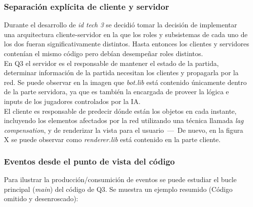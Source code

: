 \documentclass[a4paper,12pt]{report}
\begin{document}
	\subsubsection{Separación explícita de cliente y servidor}
	
	Durante el desarrollo de \textit{id tech 3} se decidió tomar la decisión de implementar una arquitectura cliente-servidor en la que los roles y subsistemas de cada uno de los dos fueran significativamente distintos. Hasta entonces los clientes y servidores contenían el mismo código pero debían desempeñar roles distintos.\\
	
	En Q3 el servidor es el responsable de mantener el estado de la partida, determinar información de la partida necesitan los clientes y propagarla por la red. Se puede observar en la imagen que \textit{bot.lib} está contenido únicamente dentro de la parte servidora, ya que es también la encargada de proveer la lógica e inputs de los jugadores controlados por la IA.\\
	
	El cliente es responsable de predecir dónde están los objetos en cada instante, incluyendo los elementos afectados por la red utilizando una técnica llamada \textit{lag compensation}, y de renderizar la vista para el usuario \,---\, De nuevo, en la figura X se puede observar como\textit{ renderer.lib} está contenido en la parte cliente.	\cite{architecture}\\
	
	\subsubsection{Eventos desde el punto de vista del código}
	
	Para ilustrar la producción/consumición de eventos se puede estudiar el bucle principal (\textit{main}) del código de Q3. Se muestra un ejemplo resumido (Código omitido y desenroscado):
	
\end{document}
